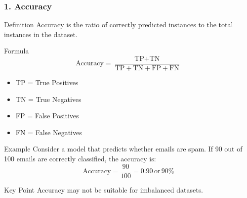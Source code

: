\documentclass[aspectratio=169]{beamer}
\begin{document}
\begin{frame}[fragile]
    \frametitle{1. Accuracy}
    \begin{block}{Definition}
        Accuracy is the ratio of correctly predicted instances to the total instances in the dataset.
    \end{block}
    
    \begin{block}{Formula}
        \begin{equation}
        \text{Accuracy} = \frac{\text{TP} + \text{TN}}{\text{TP} + \text{TN} + \text{FP} + \text{FN}}
        \end{equation}
    \end{block}

    \begin{itemize}
        \item TP = True Positives
        \item TN = True Negatives
        \item FP = False Positives
        \item FN = False Negatives
    \end{itemize}
    
    \begin{block}{Example}
        Consider a model that predicts whether emails are spam. If 90 out of 100 emails are correctly classified, the accuracy is:
        \begin{equation}
        \text{Accuracy} = \frac{90}{100} = 0.90 \, \text{or} \, 90\%
        \end{equation}
    \end{block}
    
    \begin{block}{Key Point}
        Accuracy may not be suitable for imbalanced datasets.
    \end{block}
\end{frame}
\end{document}
